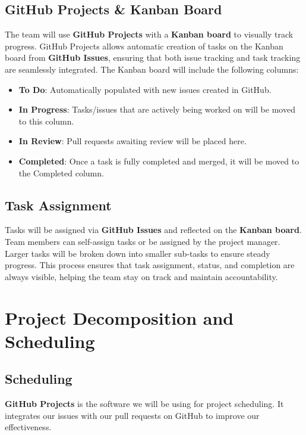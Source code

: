 \documentclass{article}
\begin{document}
\subsection{GitHub Projects \& Kanban Board}
The team will use \textbf{GitHub Projects} with a \textbf{Kanban board} to visually track progress. GitHub Projects allows automatic creation of tasks on the Kanban board from \textbf{GitHub Issues}, ensuring that both issue tracking and task tracking are seamlessly integrated. The Kanban board will include the following columns:
\begin{itemize}
    \item \textbf{To Do}: Automatically populated with new issues created in GitHub.
    \item \textbf{In Progress}: Tasks/issues that are actively being worked on will be moved to this column.
    \item \textbf{In Review}: Pull requests awaiting review will be placed here.
    \item \textbf{Completed}: Once a task is fully completed and merged, it will be moved to the Completed column.
\end{itemize}

\subsection{Task Assignment}
Tasks will be assigned via \textbf{GitHub Issues} and reflected on the \textbf{Kanban board}. Team members can self-assign tasks or be assigned by the project manager. Larger tasks will be broken down into smaller sub-tasks to ensure steady progress. This process ensures that task assignment, status, and completion are always visible, helping the team stay on track and maintain accountability.

\section{Project Decomposition and Scheduling}

\subsection{Scheduling}
\textbf{GitHub Projects} is the software we will be using for project scheduling. It integrates our issues with our pull requests on GitHub to improve our effectiveness.
\end{document}
